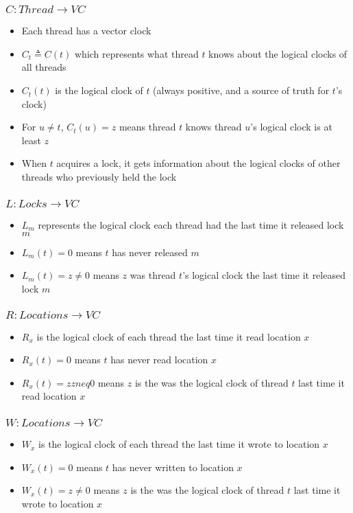 \subsubsection{$C: Thread \to VC$}
\begin{itemize}
    \item Each thread has a vector clock
    \item $C_t \triangleq C(t)$ which represents what thread $t$ knows about the logical clocks of all threads
    \item $C_t(t)$ is the logical clock of $t$ (always positive, and a source of truth for $t$'s clock)
    \item For $u \neq t$, $C_t(u)=z$ means thread $t$ knows thread $u$'s logical clock is at least $z$
    \item When $t$ acquires a lock, it gets information about the logical clocks of other threads who previously held the lock
\end{itemize}

\subsubsection{$L: Locks \to VC$}
\begin{itemize}
    \item $L_m$ represents the logical clock each thread had the last time it released lock $m$
    \item $L_m(t) = 0$ means $t$ has never released $m$
    \item $L_m(t) = z \neq 0$ means $z$ was thread $t$'s logical clock the last time it released lock $m$
\end{itemize}

\subsubsection{$R: Locations \to VC$}
\begin{itemize}
    \item $R_x$ is the logical clock of each thread the last time it read location $x$
    \item $R_x(t) = 0$ means $t$ has never read location $x$
    \item $R_x(t) = z zneq 0$ means $z$ is the was the logical clock of thread $t$ last time it read location $x$
\end{itemize}

\subsubsection{$W: Locations \to VC$}
\begin{itemize}
    \item $W_x$ is the logical clock of each thread the last time it wrote to location $x$
    \item $W_x(t) = 0$ means $t$ has never written to location $x$
    \item $W_x(t) = z \neq 0$ means $z$ is the was the logical clock of thread $t$ last time it wrote to location $x$
\end{itemize}

